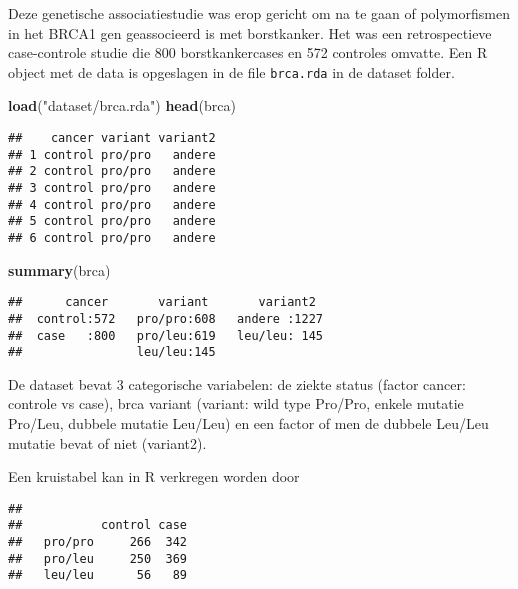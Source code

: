 \documentclass[12pt,dutch,coursenotes]{book}
\newenvironment{Shaded}{\begin{snugshade}}{\end{snugshade}}
\newcommand{\KeywordTok}[1]{\textcolor[rgb]{0.13,0.29,0.53}{\textbf{#1}}}
\newcommand{\StringTok}[1]{\textcolor[rgb]{0.31,0.60,0.02}{#1}}
\newcommand{\OperatorTok}[1]{\textcolor[rgb]{0.81,0.36,0.00}{\textbf{#1}}}
\newcommand{\NormalTok}[1]{#1}
\theoremstyle{definition}
\theoremstyle{definition}
\theoremstyle{definition}
\theoremstyle{remark}
\begin{document}
Deze genetische associatiestudie was erop gericht om na te gaan of
polymorfismen in het BRCA1 gen geassocieerd is met borstkanker. Het was
een retrospectieve case-controle studie die 800 borstkankercases en 572
controles omvatte. Een R object met de data is opgeslagen in de file
\texttt{brca.rda} in de dataset folder.

\begin{Shaded}
\begin{Highlighting}[]
\KeywordTok{load}\NormalTok{(}\StringTok{"dataset/brca.rda"}\NormalTok{)}
\KeywordTok{head}\NormalTok{(brca)}
\end{Highlighting}
\end{Shaded}

\begin{verbatim}
##    cancer variant variant2
## 1 control pro/pro   andere
## 2 control pro/pro   andere
## 3 control pro/pro   andere
## 4 control pro/pro   andere
## 5 control pro/pro   andere
## 6 control pro/pro   andere
\end{verbatim}

\begin{Shaded}
\begin{Highlighting}[]
\KeywordTok{summary}\NormalTok{(brca)}
\end{Highlighting}
\end{Shaded}

\begin{verbatim}
##      cancer       variant       variant2   
##  control:572   pro/pro:608   andere :1227  
##  case   :800   pro/leu:619   leu/leu: 145  
##                leu/leu:145
\end{verbatim}

De dataset bevat 3 categorische variabelen: de ziekte status (factor
cancer: controle vs case), brca variant (variant: wild type Pro/Pro,
enkele mutatie Pro/Leu, dubbele mutatie Leu/Leu) en een factor of men de
dubbele Leu/Leu mutatie bevat of niet (variant2).

Een kruistabel kan in R verkregen worden door

\begin{Shaded}
\end{Shaded}

\begin{verbatim}
##          
##           control case
##   pro/pro     266  342
##   pro/leu     250  369
##   leu/leu      56   89
\end{verbatim}
\end{document}
